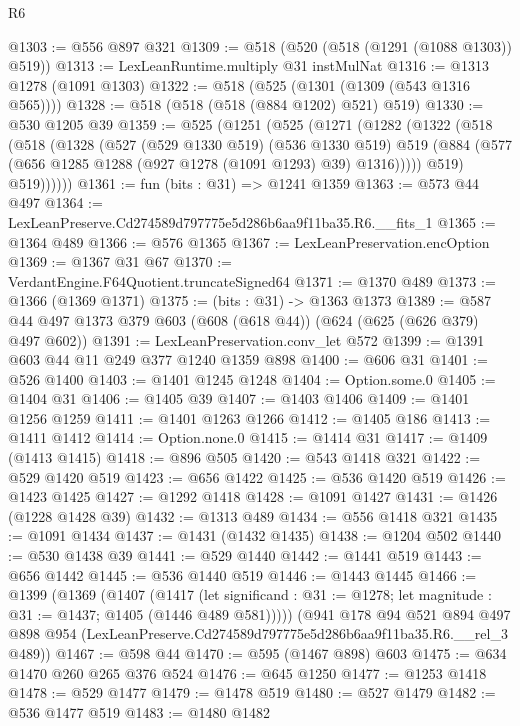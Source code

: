 \begin{lexlean}{R6}
\begin{coremodule}
@1303 := @556 @897 @321
@1309 := @518 (@520 (@518 (@1291 (@1088 @1303)) @519))
@1313 := LexLeanRuntime.multiply @31 instMulNat
@1316 := @1313 @1278 (@1091 @1303)
@1322 := @518 (@525 (@1301 (@1309 (@543 @1316 @565))))
@1328 := @518 (@518 (@518 (@884 @1202) @521) @519)
@1330 := @530 @1205 @39
@1359 := @525
    (@1251
      (@525
        (@1271
          (@1282
            (@1322
              (@518
                (@518
                  (@1328
                    (@527
                      (@529 @1330 @519)
                      (@536 @1330 @519)
                      @519
                      (@884 (@577 (@656 @1285 @1288 (@927 @1278 (@1091 @1293) @39) @1316)))))
                  @519)
                @519))))))
@1361 := fun (bits : @31) => @1241 @1359
@1363 := @573 @44 @497
@1364 := LexLeanPreserve.Cd274589d797775e5d286b6aa9f11ba35.R6.__fits_1
@1365 := @1364 @489
@1366 := @576 @1365
@1367 := LexLeanPreservation.encOption
@1369 := @1367 @31 @67
@1370 := VerdantEngine.F64Quotient.truncateSigned64
@1371 := @1370 @489
@1373 := @1366 (@1369 @1371)
@1375 := (bits : @31) -> @1363 @1373
@1389 := @587 @44 @497 @1373 @379 @603 (@608 (@618 @44)) (@624 (@625 (@626 @379) @497 @602))
@1391 := LexLeanPreservation.conv_let @572
@1399 := @1391 @603 @44 @11 @249 @377 @1240 @1359 @898
@1400 := @606 @31
@1401 := @526 @1400
@1403 := @1401 @1245 @1248
@1404 := Option.some.{0}
@1405 := @1404 @31
@1406 := @1405 @39
@1407 := @1403 @1406
@1409 := @1401 @1256 @1259
@1411 := @1401 @1263 @1266
@1412 := @1405 @186
@1413 := @1411 @1412
@1414 := Option.none.{0}
@1415 := @1414 @31
@1417 := @1409 (@1413 @1415)
@1418 := @896 @505
@1420 := @543 @1418 @321
@1422 := @529 @1420 @519
@1423 := @656 @1422
@1425 := @536 @1420 @519
@1426 := @1423 @1425
@1427 := @1292 @1418
@1428 := @1091 @1427
@1431 := @1426 (@1228 @1428 @39)
@1432 := @1313 @489
@1434 := @556 @1418 @321
@1435 := @1091 @1434
@1437 := @1431 (@1432 @1435)
@1438 := @1204 @502
@1440 := @530 @1438 @39
@1441 := @529 @1440
@1442 := @1441 @519
@1443 := @656 @1442
@1445 := @536 @1440 @519
@1446 := @1443 @1445
@1466 := @1399
    (@1369
      (@1407
        (@1417
          (let significand : @31 := @1278; let magnitude : @31 := @1437; @1405 (@1446 @489 @581)))))
    (@941
      @178
      @94
      @521
      @894
      @497
      @898
      @954
      (LexLeanPreserve.Cd274589d797775e5d286b6aa9f11ba35.R6.__rel_3 @489))
@1467 := @598 @44
@1470 := @595 (@1467 @898) @603
@1475 := @634 @1470 @260 @265 @376 @524
@1476 := @645 @1250
@1477 := @1253 @1418
@1478 := @529 @1477
@1479 := @1478 @519
@1480 := @527 @1479
@1482 := @536 @1477 @519
@1483 := @1480 @1482

\end{coremodule}
\end{lexlean}
